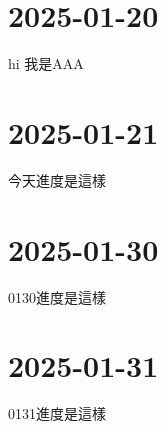 \section{2025-01-20}
hi 我是AAA

\section{2025-01-21}
今天進度是這樣

\section{2025-01-30}
0130進度是這樣


\section{2025-01-31}
0131進度是這樣